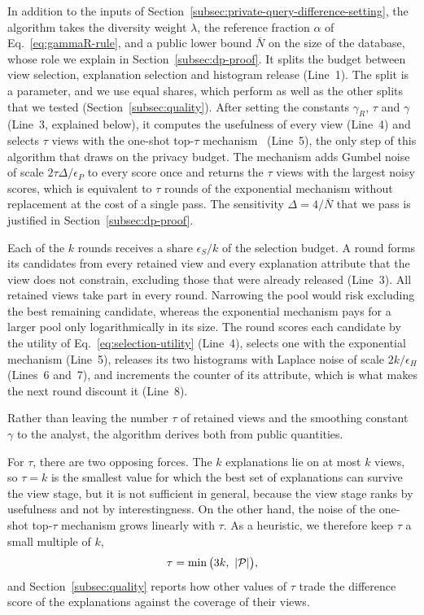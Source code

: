 In addition to the inputs of Section~\ref{subsec:private-query-difference-setting}, the algorithm takes the diversity weight $\lambda$, the reference fraction $\alpha$ of Eq.~\eqref{eq:gammaR-rule}, and a public lower bound $\bar N$ on the size of the database, whose role we explain in Section~\ref{subsec:dp-proof}.
It splits the budget between view selection, explanation selection and histogram release (Line~1).
The split is a parameter, and we use equal shares, which perform as well as the other splits that we tested (Section~\ref{subsec:quality}).
After setting the constants $\gamma_R$, $\tau$ and $\gamma$ (Line~3, explained below), it computes the usefulness of every view (Line~4) and selects $\tau$ views with the one-shot top-$\tau$ mechanism~\cite{DurfeeRogers19} (Line~5), the only step of this algorithm that draws on the privacy budget.
The mechanism adds Gumbel noise of scale $2\tau\Delta/\epsilon_P$ to every score once and returns the $\tau$ views with the largest noisy scores, which is equivalent to $\tau$ rounds of the exponential mechanism without replacement at the cost of a single pass.
The sensitivity $\Delta=4/\bar N$ that we pass is justified in Section~\ref{subsec:dp-proof}.

Each of the $k$ rounds receives a share $\epsilon_S/k$ of the selection budget.
A round forms its candidates from every retained view and every explanation attribute that the view does not constrain, excluding those that were already released (Line~3).
All retained views take part in every round.
Narrowing the pool would risk excluding the best remaining candidate, whereas the exponential mechanism pays for a larger pool only logarithmically in its size.
The round scores each candidate by the utility of Eq.~\eqref{eq:selection-utility} (Line~4), selects one with the exponential mechanism (Line~5), releases its two histograms with Laplace noise of scale $2k/\epsilon_H$ (Lines~6 and~7), and increments the counter of its attribute, which is what makes the next round discount it (Line~8).

Rather than leaving the number $\tau$ of retained views and the smoothing constant $\gamma$ to the analyst, the algorithm derives both from public quantities.

For $\tau$, there are two opposing forces.
The $k$ explanations lie on at most $k$ views, so $\tau=k$ is the smallest value for which the best set of explanations can survive the view stage, but it is not sufficient in general, because the view stage ranks by usefulness and not by interestingness.
On the other hand, the noise of the one-shot top-$\tau$ mechanism grows linearly with $\tau$.
As a heuristic, we therefore keep $\tau$ a small multiple of $k$,
\begin{equation}
\tau=\min\big(3k,\ |\mathcal{P}|\big),
\label{eq:tau-rule}
\end{equation}
and Section~\ref{subsec:quality} reports how other values of $\tau$ trade the difference score of the explanations against the coverage of their views.

